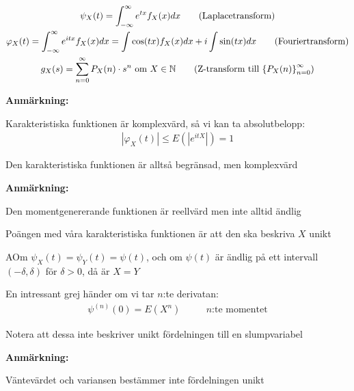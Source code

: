 \begin{equation*}
  \begin{gathered}
    \psi_X(t) = \int_{-\infty}^{\infty}e^{tx}f_X(x)dx\qquad\text{(Laplacetransform)}\\
    \varphi_X(t) = \int_{-\infty}^{\infty}e^{itx}f_X(x)dx = \int\cos(tx)f_X(x)dx+i\int\sin(tx)dx\qquad\text{(Fouriertransform)}\\
    g_X(s) = \sum_{n=0}^{\infty}P_X(n)\cdot s^n\text{ om } X\in\mathbb{N}\qquad\text{(Z-transform till $\left\{P_X(n)\right\}_{n=0}^{\infty}$)}
  \end{gathered}
\end{equation*}
\par\bigskip
\noindent\textbf{Anmärkning:}\par
\noindent Karakteristiska funktionen är komplexvärd, så vi kan ta absolutbelopp:
\begin{equation*}
  \begin{gathered}
    \left|\varphi_X(t)\right|\leq E(\left|e^{itX}\right|) = 1
  \end{gathered}
\end{equation*}\par
\noindent Den karakteristiska funktionen är alltså begränsad, men komplexvärd
\par\bigskip
\noindent\textbf{Anmärkning:}\par
\noindent Den momentgenererande funktionen är reellvärd men inte alltid ändlig
\par\bigskip
\noindent Poängen med våra karakteristiska funktionen är att den ska beskriva $X$ unikt
\par\bigskip
\begin{theo}
  AOm $\psi_X(t)=\psi_Y(t) = \psi(t)$, och om $\psi(t)$ är ändlig på ett intervall $(-\delta, \delta)$ för $\delta>0$, då är $X=Y$ 
  \par\bigskip
  \noindent En intressant grej händer om vi tar $n$:te derivatan:
  \begin{equation*}
    \begin{gathered}
      \psi^{(n)}(0) = E(X^n)\qquad\text{ $n$:te momentet}
    \end{gathered}
  \end{equation*}\par
  \noindent Notera att dessa inte beskriver unikt fördelningen till en slumpvariabel 
\end{theo}
\par\bigskip
\noindent\textbf{Anmärkning:}\par
\noindent Väntevärdet och variansen bestämmer inte fördelningen unikt
